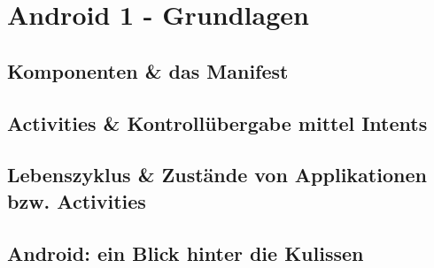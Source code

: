 \chapter{Android 1 - Grundlagen}

\section{Komponenten \& das Manifest}

\section{Activities \& Kontrollübergabe mittel Intents}

\section{Lebenszyklus \& Zustände von Applikationen bzw. Activities}

\section{Android: ein Blick hinter die Kulissen}